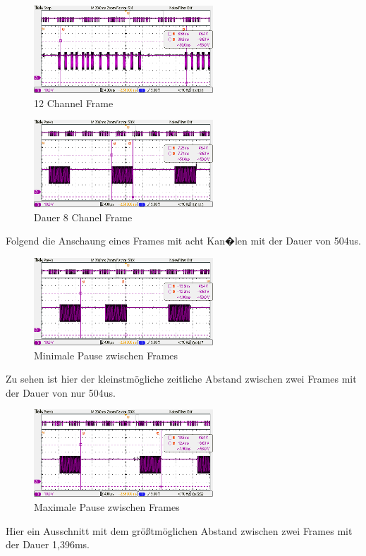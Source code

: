 \begin{figure}[H]
	\centering
	\includegraphics[width=0.6\textwidth]{fig_motor/Controller_Treiber/GraupnerGR16_12_Frame.png}
	\caption[12 Channel Frame]{12 Channel Frame}
\end{figure}


\begin{figure}[H]
\centering
\includegraphics[width=0.6\textwidth]{fig_motor/Controller_Treiber/GraupnerGR16_8_ChX_Gap.png}
\caption[Dauer 8 chanel Frame ]{Dauer 8 Chanel Frame}
\end{figure}

Folgend die Anschaung eines Frames mit acht Kan�len mit der Dauer von 504us.

\begin{figure}[H]
	\centering
	\includegraphics[width=0.6\textwidth]{fig_motor/Controller_Treiber/GraupnerGR16_8_Ch1_Min.png}
	\caption[Minimale Pause zwischen Frames]{Minimale Pause zwischen Frames}
\end{figure}

Zu sehen ist hier der kleinstmögliche zeitliche Abstand zwischen zwei Frames mit der Dauer von nur 504us.

\begin{figure}[H]
	\centering
	\includegraphics[width=0.6\textwidth]{fig_motor/Controller_Treiber/GraupnerGR16_8_Ch1_Max.png}
	\caption[Maximale Pause zwischen Frames]{Maximale Pause zwischen Frames}
\end{figure}

Hier ein Ausschnitt mit dem größtmöglichen Abstand zwischen zwei Frames mit der Dauer 1,396ms.


